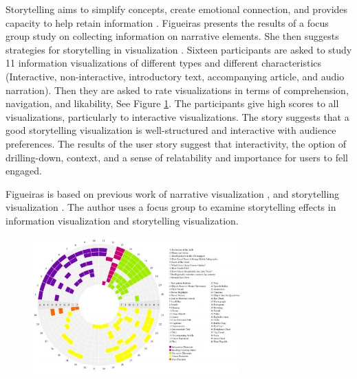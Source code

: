 \documentclass{egpubl}
\begin{document}
Storytelling aims to simplify concepts, create emotional connection, and provides capacity to help retain information \cite{figueiras2014tell}.
Figueiras presents the results of a focus group study on collecting information on narrative elements. She then suggests strategies for storytelling in visualization \cite{figueiras2014tell}.
Sixteen participants are asked to study 11 information visualizations of different types and different characteristics (Interactive, non-interactive, introductory text, accompanying article, and audio narration). Then they are asked to rate visualizations in terms of  comprehension, navigation, and likability, See Figure \ref{fig:fig2014}.
The participants give high scores to all visualizations, particularly to interactive visualizations. The story suggests that a good storytelling visualization is well-structured and interactive with audience preferences. The results of the user story suggest that interactivity, the option of drilling-down, context, and a sense of relatability and importance for users to fell engaged.

Figueiras is based on previous work of narrative visualization \cite{segal}, and storytelling visualization \cite{Kosara,sci}. The author uses a focus group to examine storytelling effects in information visualization and storytelling visualization.
\begin{figure}
\begingroup
\centering
\includegraphics[width=8cm]{./images/fig2014}
\label{fig:fig2014}
\endgroup
\end{figure}
\end{document}
